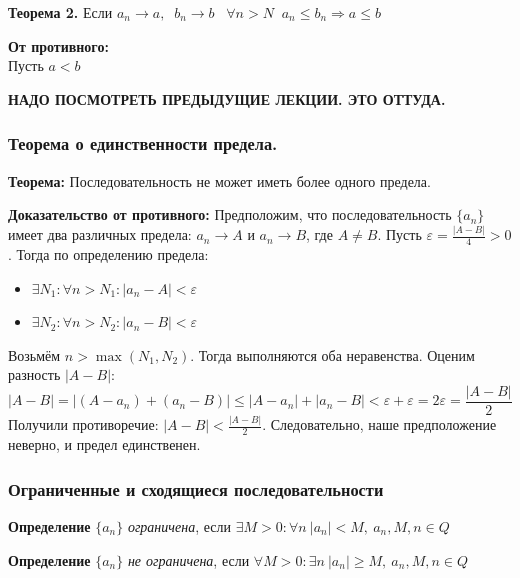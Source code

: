 \documentclass[12pt, a4paper]{article}
\newcommand{\eps}{\varepsilon}
\begin{document}
\begin{centering}
\begin{tcolorbox}
    \textbf{Теорема 2.} Если $ a_n\to a,\;\; b_n\to b \;\;\;\forall n > N \;\; a_n \leq b_n \Rightarrow a\leq b $
\end{tcolorbox}
\begin{tcolorbox}[title=Доказательство]
    \textbf{От противного:}\\ 
    Пусть $ a < b$
\end{tcolorbox}
\textbf{НАДО ПОСМОТРЕТЬ ПРЕДЫДУЩИЕ ЛЕКЦИИ. ЭТО ОТТУДА.}

\subsubsection{Теорема о единственности предела.}
\textbf{Теорема:} Последовательность не может иметь более одного предела.

\begin{tcolorbox}[title=Доказательство теоремы, breakable]
\textbf{Доказательство от противного:}
Предположим, что последовательность $\{a_n\}$ имеет два различных предела: $a_n \to A$ и $a_n \to B$, где $A \neq B$.
Пусть $\eps = \frac{|A - B|}{4} > 0$. Тогда по определению предела:
\begin{itemize}
    \item $\exists N_1: \forall n > N_1: |a_n - A| < \eps$
    \item $\exists N_2: \forall n > N_2: |a_n - B| < \eps$
\end{itemize}
Возьмём $n > \max(N_1, N_2)$. Тогда выполняются оба неравенства. Оценим разность $|A - B|$:
$$|A - B| = |(A - a_n) + (a_n - B)| \leq |A - a_n| + |a_n - B| < \eps + \eps = 2\eps = \frac{|A - B|}{2}$$
Получили противоречие: $|A - B| < \frac{|A - B|}{2}$. Следовательно, наше предположение неверно, и предел единственен.
\end{tcolorbox}

\subsubsection{Ограниченные и сходящиеся последовательности}

\begin{tcolorbox}
\textbf{Определение}
$\{a_n\}$  \textit{ограничена}, если $\exists M>0: \forall n\ |a_n|<M,\ a_n, M, n \in Q$
\end{tcolorbox}

\begin{tcolorbox}
\textbf{Определение}
$\{a_n\}$  \textit{не ограничена}, если $\forall M>0: \exists n\ |a_n|\geq M,\ a_n, M, n \in Q$ 
\end{tcolorbox}


\end{centering}
\end{document}
